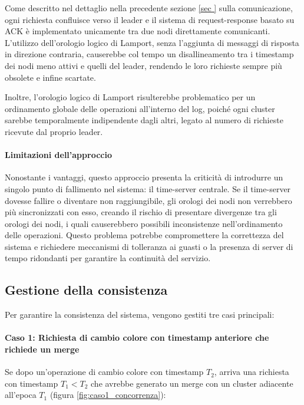 \documentclass[12pt, a4paper]{report}
\begin{document}
Come descritto nel dettaglio nella precedente sezione \ref{sec
} sulla comunicazione, ogni richiesta confluisce verso il leader e il sistema di request-response basato su ACK \`e implementato unicamente tra due nodi direttamente comunicanti. L'utilizzo dell'orologio logico di Lamport, senza l'aggiunta di messaggi di risposta in direzione contraria, causerebbe col tempo un disallineamento tra i timestamp dei nodi meno attivi e quelli del leader, rendendo le loro richieste sempre pi\`u obsolete e infine scartate.

Inoltre, l'orologio logico di Lamport risulterebbe problematico per un ordinamento globale delle operazioni all'interno del log, poiché ogni cluster sarebbe temporalmente indipendente dagli altri, legato al numero di richieste ricevute dal proprio leader.

\paragraph{Limitazioni dell'approccio}

Nonostante i vantaggi, questo approccio presenta la criticit\`a di introdurre un singolo punto di fallimento nel sistema: il time-server centrale. Se il time-server dovesse fallire o diventare non raggiungibile, gli orologi dei nodi non verrebbero pi\`u sincronizzati con esso, creando il rischio di presentare divergenze tra gli orologi dei nodi, i quali causerebbero possibili inconsistenze nell'ordinamento delle operazioni. Questo problema potrebbe compromettere la correttezza del sistema e richiedere meccanismi di tolleranza ai guasti o la presenza di server di tempo ridondanti per garantire la continuit\`a del servizio.

\newpage
\subsection{Gestione della consistenza}\label{sec:gestione_consistenza}

Per garantire la consistenza del sistema, vengono gestiti tre casi principali:

\paragraph{Caso 1: Richiesta di cambio colore con timestamp anteriore che richiede un merge}

Se dopo un'operazione di cambio colore con timestamp $T_2$, arriva una richiesta con timestamp $T_1 < T_2$ che avrebbe generato un merge con un cluster adiacente all'epoca $T_1$ (figura \ref{fig:caso1_concorrenza}):
\end{document}
